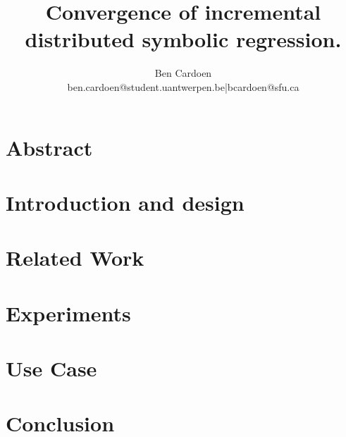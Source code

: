 \documentclass[twocolumn]{article}
\title{Convergence of incremental distributed symbolic regression.
    }
\author{
    Ben Cardoen  \\
    {ben.cardoen@student.uantwerpen.be|bcardoen@sfu.ca}
}
\date{}
\begin{document}
    
    \maketitle
    \section{Abstract}
    
    \section{Introduction and design}
    
    \section{Related Work}
    
    \section{Experiments}
    
    \section{Use Case}
    
    \section{Conclusion}
    
%    
    
    
    
\end{document}
